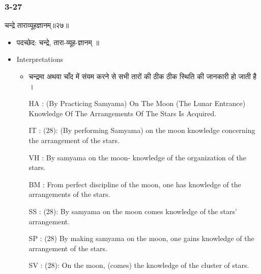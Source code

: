 \begin{frame}[fragile]\frametitle{3-27}
\begin{sanskrit}
चन्द्रे ताराव्यूहज्ञानम्॥२७॥
\end{sanskrit}

	\begin{itemize}
	\item पदच्छेद:  चन्द्रे, तारा-व्यूह-ज्ञानम् ॥
	\item Interpretations
		\begin{itemize}	
		\item चन्द्रमा अथवा चाँद में संयम करने से सभी तारों की ठीक ठीक स्थिति की जानकारी हो जाती है ।
		\item [HA]: (By Practicing Samyama) On The Moon (The Lunar Entrance) Knowledge Of The Arrangements Of The Stars Is Acquired.
		\item [IT]: (28): (By performing Samyama) on the moon knowledge concerning the arrangement of the stars.
		\item [VH]: By samyama on the moon- knowledge of the organization of the stars.
		\item [BM]: From perfect discipline of the moon, one has knowledge of the arrangements of the stars.
		\item [SS]: (28): By samyama on the moon comes knowledge of the stars’ arrangement.
		\item [SP]: (28) By making samyama on the moon, one gains knowledge of the arrangement of the stars.
		\item [SV]: (28): On the moon, (comes) the knowledge of the cluster of stars. 
		\end{itemize}
	\end{itemize}
\end{frame}

